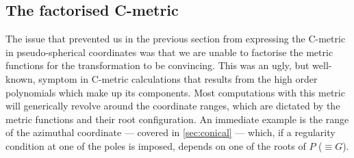 \documentclass[
twoside,
openright,
frontopenright,
]{dmathesis}
\begin{document}
\subsection{The factorised C-metric}
\label{sec:factorised}

The issue that prevented us in the previous section from expressing the C-metric
in pseudo-spherical coordinates was that we are unable to factorise the metric
functions for the transformation to be convincing. This was an ugly, but
well-known, symptom in C-metric calculations that results from the high order
polynomials which make up its components. Most computations with this metric
will generically revolve around the coordinate ranges, which are dictated by the
metric functions and their root configuration. An immediate example is the range
of the azimuthal coordinate --- covered in \cref{sec:conical} --- which, if a
regularity condition at one of the poles is imposed, depends on one of the roots
of $P$ ($\equiv G$).
\end{document}
